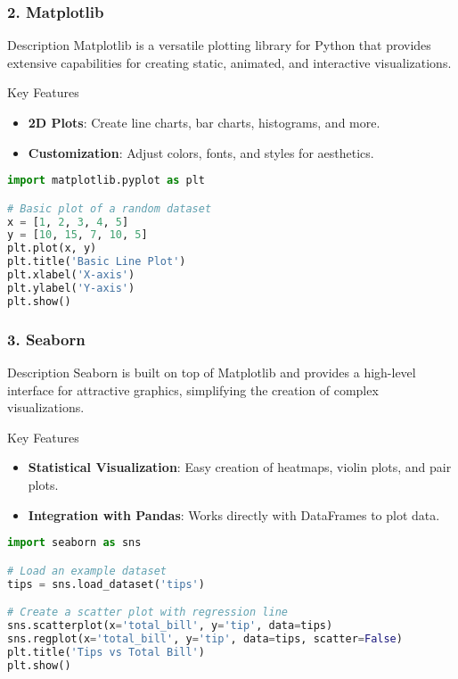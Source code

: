 \documentclass[aspectratio=169]{beamer}
\begin{document}
\begin{frame}[fragile]
    \frametitle{2. Matplotlib}
    \begin{block}{Description}
        Matplotlib is a versatile plotting library for Python that provides extensive capabilities for creating static, animated, and interactive visualizations.
    \end{block}
    \begin{block}{Key Features}
        \begin{itemize}
            \item \textbf{2D Plots}: Create line charts, bar charts, histograms, and more.
            \item \textbf{Customization}: Adjust colors, fonts, and styles for aesthetics.
        \end{itemize}
    \end{block}
    \begin{lstlisting}[language=Python]
import matplotlib.pyplot as plt

# Basic plot of a random dataset
x = [1, 2, 3, 4, 5]
y = [10, 15, 7, 10, 5]
plt.plot(x, y)
plt.title('Basic Line Plot')
plt.xlabel('X-axis')
plt.ylabel('Y-axis')
plt.show()
    \end{lstlisting}
\end{frame}

\begin{frame}[fragile]
    \frametitle{3. Seaborn}
    \begin{block}{Description}
        Seaborn is built on top of Matplotlib and provides a high-level interface for attractive graphics, simplifying the creation of complex visualizations.
    \end{block}
    \begin{block}{Key Features}
        \begin{itemize}
            \item \textbf{Statistical Visualization}: Easy creation of heatmaps, violin plots, and pair plots.
            \item \textbf{Integration with Pandas}: Works directly with DataFrames to plot data.
        \end{itemize}
    \end{block}
    \begin{lstlisting}[language=Python]
import seaborn as sns

# Load an example dataset
tips = sns.load_dataset('tips')

# Create a scatter plot with regression line
sns.scatterplot(x='total_bill', y='tip', data=tips)
sns.regplot(x='total_bill', y='tip', data=tips, scatter=False)
plt.title('Tips vs Total Bill')
plt.show()
    \end{lstlisting}
\end{frame}
\end{document}
